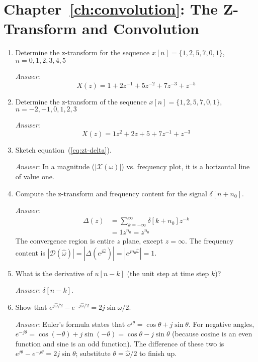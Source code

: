 \section{Chapter~\ref{ch:convolution}: The Z-Transform and Convolution}
\label{sc:ch6ex}

\begin{enumerate}

\item Determine the z-transform for the sequence
  $x[n]=\{1,2,5,7,0,1\}$, $n=0,1,2,3,4,5$\label{it:ch6ex1}

  \textit{Answer}:
  \begin{equation}
    X(z)=1+2z^{-1}+5z^{-2}+7z^{-3}+z^{-5}
  \end{equation}

\item Determine the z-transform of the sequence
  $x[n]=\{1,2,5,7,0,1\}$, $n=-2,-1,0,1,2,3$\label{it:ch6ex2}

  \textit{Answer}:
  \begin{equation}
    X(z)=1z^2+2z+5+7z^{-1}+z^{-3}
  \end{equation}

\item Sketch equation~(\ref{eq:zt-delta}).\label{it:ch6ex3}

  \textit{Answer}: In a magnitude ($|\mathcal{X}(\omega)|$)
  vs. frequency plot, it is a horizontal line of value one.

\item Compute the z-transform and frequency content for the signal
  $\delta[n+n_0]$.\label{it:ch6ex4}

  \textit{Answer}:
  \begin{align*}
    \Delta(z) &= \sum_{k=-\infty}^{\infty} \delta[k+n_0] z^{-k} \\
    &= 1z^{n_0}=z^{n_0}
  \end{align*}
  The convergence region is entire $z$ plane, except $z=\infty$. The
  frequency content is
  $|\mathcal{D}(\hat{\omega})| = |\Delta(e^{j\hat{\omega}})| =
  |e^{jn_0\hat{\omega}}|=1$.

\item What is the derivative of $u[n-k]$ (the unit step at time step
  $k$)?\label{it:ch6ex5}

  \textit{Answer}: $\delta[n-k]$.

\item Show that $e^{j\hat{\omega}/2}-e^{-j\hat{\omega}/2} =
  2j\sin\omega/2$.\label{it:ch6ex6}

  \textit{Answer}: Euler's formula states that $e^{j\theta} =
  \cos\theta + j\sin\theta$. For negative angles, $e^{-j\theta} =
  \cos(-\theta) + j\sin(-\theta) = \cos\theta - j\sin\theta$ (because
  cosine is an even function and sine is an odd function). The
  difference of these two is $e^{j\theta}-e^{-j\theta} =
  2j\sin\theta$; substitute $\theta=\hat{\omega}/2$ to finish up.


\end{enumerate}
